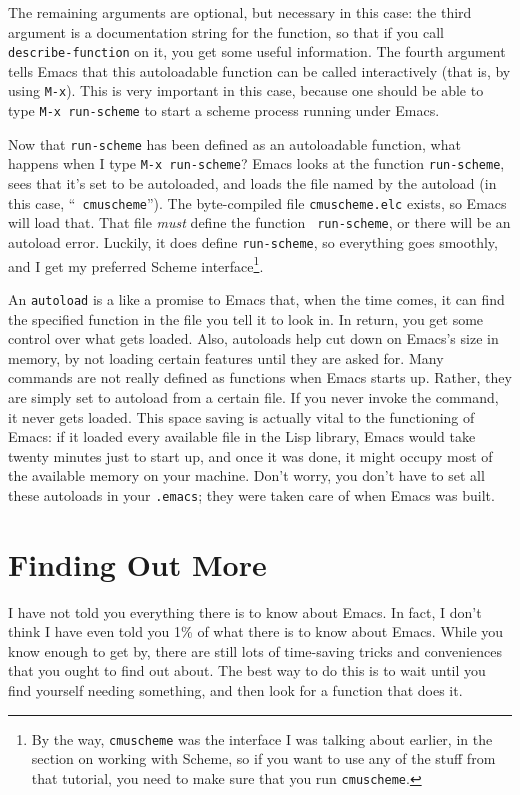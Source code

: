         The remaining arguments are optional, but necessary in this
case: the third argument is a documentation string for the function,
so that if you call {\tt describe-function} on it, you get some useful
information.  The fourth argument tells Emacs that this autoloadable
function can be called interactively (that is, by using {\tt M-x}).
This is very important in this case, because one should be able to
type {\tt M-x run-scheme} to start a scheme process running under
Emacs.

        Now that {\tt run-scheme} has been defined as an autoloadable
function, what happens when I type {\tt M-x run-scheme}?  Emacs looks
at the function {\tt run-scheme}, sees that it's set to be autoloaded,
and loads the file named by the autoload (in this case, ``{\tt
cmuscheme}'').  The byte-compiled file {\tt cmuscheme.elc} exists, so
Emacs will load that.  That file {\em must} define the function {\tt
run-scheme}, or there will be an autoload error.  Luckily, it does
define {\tt run-scheme}, so everything goes smoothly, and I get my
preferred Scheme interface\footnote{By the way, {\tt cmuscheme} was
the interface I was talking about earlier, in the section on working
with Scheme, so if you want to use any of the stuff from that
tutorial, you need to make sure that you run {\tt cmuscheme}.}.

        An {\tt autoload} is a like a promise to Emacs that, when the
time comes, it can find the specified function in the file you tell it
to look in.  In return, you get some control over what gets loaded.
Also, autoloads help cut down on Emacs's size in memory, by not loading
certain features until they are asked for.  Many commands are not
really defined as functions when Emacs starts up.  Rather, they are
simply set to autoload from a certain file.  If you never invoke the
command, it never gets loaded.  This space saving is actually vital to
the functioning of Emacs: if it loaded every available file in the
Lisp library, Emacs would take twenty minutes just to start up, and
once it was done, it might occupy most of the available memory on your
machine.  Don't worry, you don't have to set all these autoloads in
your {\tt .emacs}; they were taken care of when Emacs was built.
        
\section{Finding Out More}

        I have not told you everything there is to know about Emacs.
In fact, I don't think I have even told you 1\% of what there is to
know about Emacs.  While you know enough to get by, there are still
lots of time-saving tricks and conveniences that you ought to find out
about.  The best way to do this is to wait until you find yourself
needing something, and then look for a function that does it.

